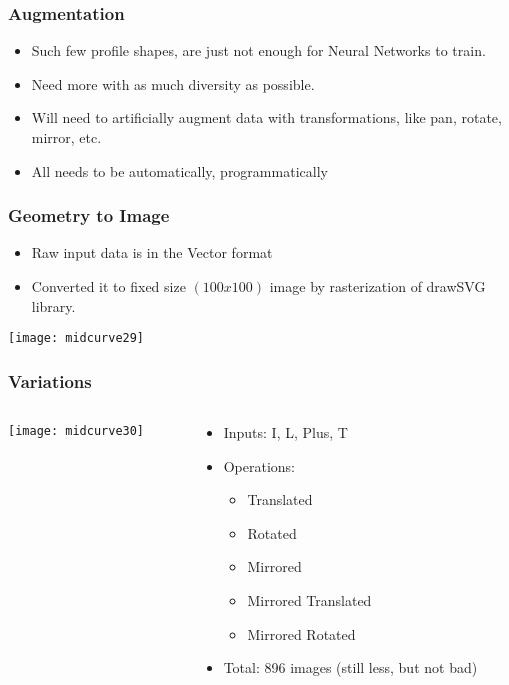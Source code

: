 \begin{frame}[fragile]\frametitle{Augmentation}

	\begin{itemize}
	\item Such few profile shapes, are  just not enough for Neural Networks to train.
	\item Need more with as much diversity as possible.
	\item Will need to artificially augment data with transformations, like pan, rotate, mirror, etc.
	\item All needs to be automatically, programmatically
	\end{itemize}
	
\end{frame}

\begin{frame}[fragile]\frametitle{Geometry to Image}
	\begin{itemize}
	\item Raw input data is in the Vector format
	\item Converted it to fixed size $(100x100)$ image by rasterization of drawSVG library.
	\end{itemize}
\begin{center}
\texttt{[image: midcurve29]}
\end{center}	
\end{frame}

\begin{frame}[fragile]\frametitle{Variations}

  \begin{columns}[t]
    \begin{column}[T]{0.4\linewidth}
      \centering
      \texttt{[image: midcurve30]}
    \end{column}
    \begin{column}[T]{0.6\linewidth}
	\begin{itemize}
	\item Inputs: I, L, Plus, T
	\item Operations:
	\begin{itemize}
		\item Translated
		\item Rotated
		\item Mirrored
		\item Mirrored Translated
		\item Mirrored Rotated
	\end{itemize}
	\item Total: 896 images (still less, but not bad)
	\end{itemize}
    \end{column}
  \end{columns}
  \end{frame}
  
